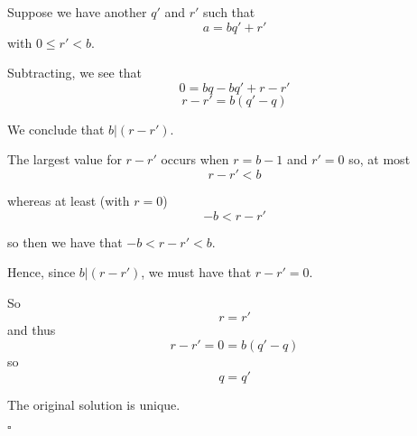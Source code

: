 \documentclass[11pt, oneside]{article}
\begin{document}
Suppose we have another $q'$ and $r'$ such that
\[ a = bq' + r' \]
with $0 \le r' < b$.

Subtracting, we see that
\[ 0 = bq - bq' + r - r' \]
\[ r - r' = b(q' - q) \]

We conclude that $b | (r - r')$.

The largest value for $r - r'$ occurs when $r = b -1$ and $r' = 0$ so, at most
\[ r - r' < b \]

whereas at least (with $r = 0$)
\[ -b < r - r' \]

so then we have that $-b < r - r' < b$.  

Hence, since $b | (r - r')$, we must have that $r - r' = 0$.  

So
\[ r = r' \]
and thus
\[ r - r' = 0 = b(q' - q) \]
so 
\[ q = q' \]

The original solution is unique.

$\square$
\end{document}
